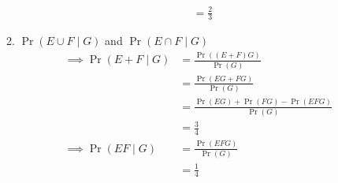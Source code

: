 \documentclass{article}
\providecommand{\pr}[1]{\ensuremath{\Pr\left(#1\right)}}
\providecommand{\pr}[1]{\ensuremath{\Pr\left(#1\right)}}
\begin{document}
\begin{enumerate}[label=13.\arabic{enumi}.\arabic{enumii}]
\begin{enumerate}
\begin{align}
&=\frac{2}{3}
\end{align}
\item $\pr{{E \cup F} \mid G}$ and $\pr{{E \cap F} \mid G}$
\begin{align}
\implies \pr{{E+F} \mid G} &= \frac{\pr{{(E+F)}G}}{\pr{G}}\\
&=\frac{\pr{{EG+F}G}}{\pr{G}}\\
&=\frac{\pr{EG}+\pr{FG}-\pr{EFG}}{\pr{G}}\\
&=\frac{3}{4}\\
\implies \pr{{EF} \mid G} &= \frac{\pr{EFG}}{\pr{G}}\\
&=\frac{1}{4}
\end{align}
\end{enumerate}
\end{enumerate}
\end{document}
